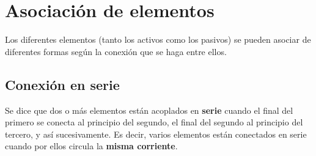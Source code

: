   \section{Asociación de elementos}
	
  Los diferentes elementos (tanto los activos como los pasivos) se
  pueden asociar de diferentes formas según la conexión que se haga
  entre ellos.
	
	\subsection{Conexión en serie}
	Se dice que dos o más elementos están acoplados en
        \textbf{serie} cuando el final del primero se conecta al
        principio del segundo, el final del segundo al principio del
        tercero, y así sucesivamente. Es decir, varios elementos están
        conectados en serie cuando por ellos circula la \textbf{misma
          corriente}.
	
